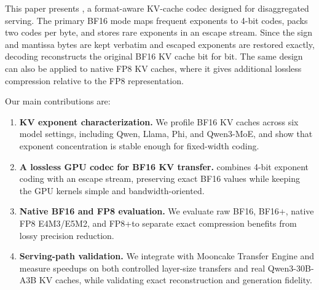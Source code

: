 This paper presents \splitzip, a format-aware KV-cache codec designed for disaggregated serving. The primary BF16 mode maps frequent exponents to 4-bit codes, packs two codes per byte, and stores rare exponents in an escape stream. Since the sign and mantissa bytes are kept verbatim and escaped exponents are restored exactly, decoding reconstructs the original BF16 KV cache bit for bit. The same design can also be applied to native FP8 KV caches, where it gives additional lossless compression relative to the FP8 representation.

Our main contributions are:

\begin{enumerate}[nosep,leftmargin=*]
\item \textbf{KV exponent characterization.} We profile BF16 KV caches across six model settings, including Qwen, Llama, Phi, and Qwen3-MoE, and show that exponent concentration is stable enough for fixed-width coding.

\item \textbf{A lossless GPU codec for BF16 KV transfer.} \splitzip combines 4-bit exponent coding with an escape stream, preserving exact BF16 values while keeping the GPU kernels simple and bandwidth-oriented.

\item \textbf{Native BF16 and FP8 evaluation.} We evaluate raw BF16, BF16+\splitzip, native FP8 E4M3/E5M2, and FP8+\splitzip to separate exact compression benefits from lossy precision reduction.

\item \textbf{Serving-path validation.} We integrate \splitzip with Mooncake Transfer Engine and measure speedups on both controlled layer-size transfers and real Qwen3-30B-A3B KV caches, while validating exact reconstruction and generation fidelity.
\end{enumerate}
